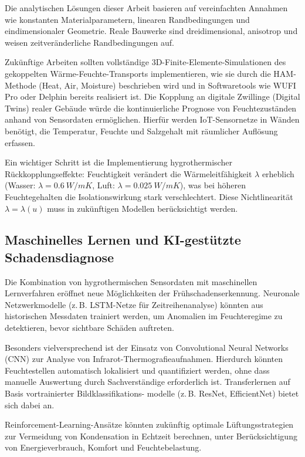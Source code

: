 ﻿\documentclass[a4paper,12pt]{article}
\theoremstyle{definition}
\begin{document}
Die analytischen L\"osungen dieser Arbeit basieren auf vereinfachten
Annahmen wie konstanten Materialparametern, linearen Randbedingungen
und eindimensionaler Geometrie. Reale Bauwerke sind dreidimensional,
anisotrop und weisen zeitver\"anderliche Randbedingungen auf.

Zuk\"unftige Arbeiten sollten vollst\"andige 3D-Finite-Elemente-Simulationen
des gekoppelten W\"arme-Feuchte-Transports implementieren,
wie sie durch die HAM-Methode (Heat, Air, Moisture) beschrieben wird
und in Softwaretools wie WUFI Pro oder Delphin bereits realisiert ist.
Die Kopplung an digitale Zwillinge (Digital Twins) realer Geb\"aude
w\"urde die kontinuierliche Prognose von Feuchtezust\"anden anhand von
Sensordaten erm\"oglichen. Hierf\"ur werden IoT-Sensornetze in W\"anden
ben\"otigt, die Temperatur, Feuchte und Salzgehalt mit r\"aumlicher
Aufl\"osung erfassen.

Ein wichtiger Schritt ist die Implementierung hygrothermischer
R\"uckkopplungseffekte: Feuchtigkeit ver\"andert die W\"armeleitf\"ahigkeit
$\lambda$ erheblich (Wasser: $\lambda = \SI{0.6}{W/mK}$,
Luft: $\lambda = \SI{0.025}{W/mK}$), was bei h\"oheren Feuchtegehalten
die Isolationswirkung stark verschlechtert. Diese Nichtlinearit\"at
$\lambda = \lambda(u)$ muss in zuk\"unftigen Modellen ber\"ucksichtigt werden.

\subsection{Maschinelles Lernen und KI-gest\"utzte Schadensdiagnose}

Die Kombination von hygrothermischen Sensordaten mit maschinellen
Lernverfahren er\"offnet neue M\"oglichkeiten der Fr\"uhschadenserkennung.
Neuronale Netzwerkmodelle (z.\,B. LSTM-Netze f\"ur Zeitreihenanalyse)
k\"onnten aus historischen Messdaten trainiert werden, um Anomalien
im Feuchteregime zu detektieren, bevor sichtbare Sch\"aden auftreten.

Besonders vielversprechend ist der Einsatz von Convolutional Neural
Networks (CNN) zur Analyse von Infrarot-Thermografieaufnahmen.
Hierdurch k\"onnten Feuchtestellen automatisch lokalisiert und
quantifiziert werden, ohne dass manuelle Auswertung durch Sachverst\"andige
erforderlich ist. Transferlernen auf Basis vortrainierter Bildklassifikations-
modelle (z.\,B. ResNet, EfficientNet) bietet sich dabei an.

Reinforcement-Learning-Ans\"atze k\"onnten zuk\"unftig optimale
L\"uftungsstrategien zur Vermeidung von Kondensation in Echtzeit
berechnen, unter Ber\"ucksichtigung von Energieverbrauch,
Komfort und Feuchtebelastung.
\end{document}

